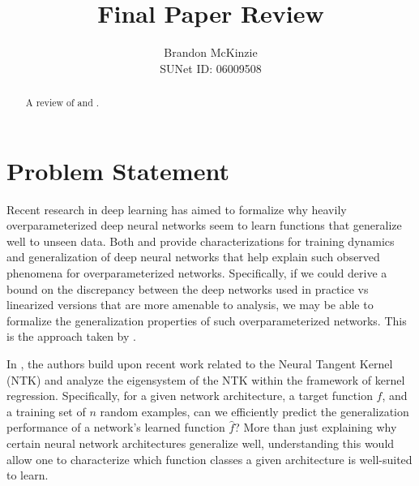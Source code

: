 \documentclass{article}
\newcommand\mc{\mathcal}
\begin{document}
\title{\vspace{-14mm}\fontsize{24pt}{10pt}\selectfont\textbf{Final Paper Review}}
\author{Brandon McKinzie \\ SUNet ID: 06009508}
\date{}  
\maketitle

\thispagestyle{fancy}

\begin{abstract}
	A review of \cite{lee2019} and \cite{simon2021}. 
\end{abstract}

\newcommand\f[1][t]{f(\mc X, \theta_{#1})}
\newcommand\g[1][t]{\f[#1] - \mc Y}
\newcommand\J[1][t]{\nabla_{\theta} \f[#1]}

\section{Problem Statement}

Recent research in deep learning has aimed to formalize why heavily overparameterized deep neural networks seem to learn functions that generalize well to unseen data. Both \cite{lee2019} and \cite{simon2021} provide characterizations for training dynamics and generalization of deep neural networks that help explain such observed phenomena for overparameterized networks. Specifically, if we could derive a bound on the discrepancy between the deep networks used in practice vs linearized versions that are more amenable to analysis, we may be able to formalize the generalization properties of such overparameterized networks. This is the approach taken by \cite{lee2019}.  


In \cite{simon2021}, the authors build upon recent work related to the Neural Tangent Kernel (NTK) and analyze the eigensystem of the NTK within the framework of kernel regression. Specifically, for a given network architecture, a target function $f$, and a training set of $n$ random examples, can we efficiently predict the generalization performance of a network's learned function $\hat f$? More than just explaining why certain neural network architectures generalize well, understanding this would allow one to characterize which function classes a given architecture is well-suited to learn. 
\end{document}
